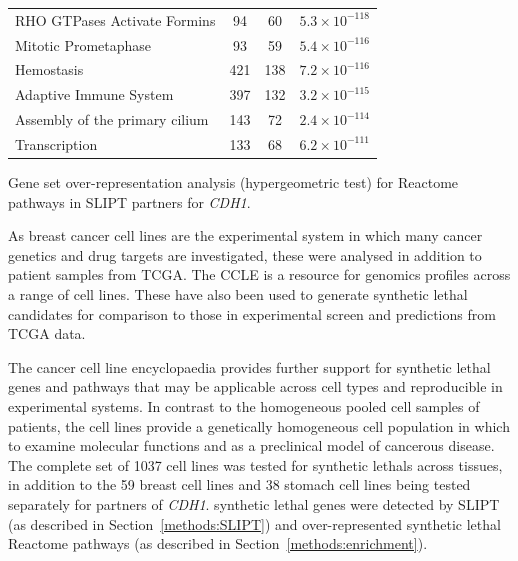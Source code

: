 \begin{table}[!b]
{\begin{threeparttable}
\begin{tabular}{lccc}
  \rowcolor{black!10}
  RHO GTPases Activate Formins &  94 &  60 & $5.3 \times 10^{-118}$ \\ 
  \rowcolor{black!5}
  Mitotic Prometaphase &  93 &  59 & $5.4 \times 10^{-116}$ \\ 
  \rowcolor{black!10}
  Hemostasis & 421 & 138 & $7.2 \times 10^{-116}$ \\ 
  \rowcolor{black!5}
  Adaptive Immune System & 397 & 132 & $3.2 \times 10^{-115}$ \\ 
  \rowcolor{black!10}
  Assembly of the primary cilium & 143 &  72 & $2.4 \times 10^{-114}$ \\ 
  \rowcolor{black!5}
  Transcription & 133 &  68 & $6.2 \times 10^{-111}$ \\ 
   \hline
\end{tabular}
\begin{tablenotes}
\raggedright \small
Gene set over-representation analysis (hypergeometric test) for Reactome \glspl{pathway} in \gls{SLIPT} partners for \textit{CDH1}.
\end{tablenotes}
\end{threeparttable}
}
\end{table}

As breast cancer cell lines are the experimental system in which many cancer genetics and drug targets are investigated, these were analysed in addition to patient samples from \gls{TCGA}. The CCLE is a resource for \glspl{genomic} profiles across a range of cell lines. These have also been used to generate \gls{synthetic lethal} candidates for comparison to those in experimental screen and predictions from \gls{TCGA}  data.

The cancer cell line encyclopaedia provides further support for \gls{synthetic lethal} genes and \glspl{pathway} that may be applicable across cell types and reproducible in experimental systems. In contrast to the homogeneous pooled cell samples of patients,  the cell lines provide a genetically homogeneous cell population in which to examine molecular functions and as a preclinical model of cancerous disease. The complete set of 1037 cell lines was tested for \glspl{synthetic lethal} across tissues, in addition to the 59 breast cell lines and 38 stomach cell lines being tested separately for partners of \textit{CDH1}. \Gls{synthetic lethal} genes were detected by \gls{SLIPT} (as described in Section~\ref{methods:SLIPT}) and over-represented \gls{synthetic lethal} Reactome \glspl{pathway} (as described in Section~\ref{methods:enrichment}). 

